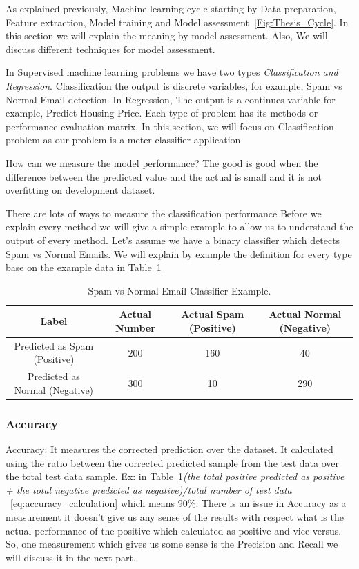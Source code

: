 As explained previously, Machine learning cycle starting by Data preparation, Feature extraction, Model training and Model assessment~\ref{Fig:Thesis_Cycle}. In this section we will explain the meaning by model assessment. Also, We will discuss different techniques for model assessment.

In Supervised machine learning problems we have two types \textit{Classification and Regression}. Classification the output is discrete variables, for example, Spam vs Normal Email detection. In Regression, The output is a continues variable for example, Predict Housing Price. Each type of problem has its methods or performance evaluation matrix. In this section, we will focus on Classification problem as our problem is a meter classifier application.

How can we measure the model performance? The good is good when the difference between the predicted value and the actual is small and it is not overfitting on development dataset.

There are lots of ways to measure the classification performance Before we explain every method we will give a simple example to allow us to understand the output of every method. Let’s assume we have a binary classifier which detects Spam vs Normal Emails. We will explain by example the definition for every type base on the example data in Table~\ref{Tab:EmailClassifier}

\begin{table}[t]
  \centering
  \begin{tabular}{c c c c}
    \toprule
    \textbf{Label}& \textbf{Actual Number}& \textbf{Actual Spam (Positive)} &  \textbf{Actual Normal (Negative)}\\
    \midrule
    Predicted as Spam (Positive)   & 200 & \cellcolor{green!25}160 & \cellcolor{red!25}40 \\
    Predicted as Normal (Negative)      & 300   & \cellcolor{red!25}10   & \cellcolor{green!25}290\\
    \bottomrule
  \end{tabular}
  \caption{Spam vs Normal Email Classifier Example.}\label{Tab:EmailClassifier}
\end{table}


\subsubsection{Accuracy}

Accuracy: It measures the corrected prediction over the dataset. It calculated using the ratio between the corrected predicted sample from the test data over the total test data sample. Ex: in Table~\ref{Tab:EmailClassifier}\textit{(the total positive predicted as positive + the total negative predicted as negative)/total number of test data }~\eqref{eq:accuracy_calculation} which means 90\%. There is an issue in Accuracy as a measurement it doesn’t give us any sense of the results with respect what is the actual performance of the positive which calculated as positive and vice-versus. So, one measurement which gives us some sense is the Precision and Recall we will discuss it in the next part.

